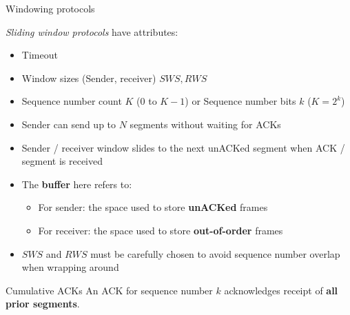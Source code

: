 \begin{definition}
    {Windowing protocols}

    \textit{Sliding window protocols} have attributes:
    \begin{itemize}
        \item Timeout
        \item Window sizes (Sender, receiver) $SWS, RWS$
        \item Sequence number count $K$ (0 to $K-1$) or Sequence number bits $k$ ($K = 2^k$)
    \end{itemize}

    \begin{itemize}
        \item Sender can send up to $N$ segments without waiting for ACKs
        \item Sender / receiver window slides to the next unACKed segment when ACK / segment is received
        \item The \textbf{buffer} here refers to:
              \begin{itemize}
                  \item For sender: the space used to store \textbf{unACKed} frames
                  \item For receiver: the space used to store \textbf{out-of-order} frames
              \end{itemize}
        \item $SWS$ and $RWS$ must be carefully chosen to avoid sequence number overlap when wrapping around
    \end{itemize}
\end{definition}

\begin{knBox}
    {Cumulative ACKs}
    An ACK for sequence number $k$ acknowledges receipt of \textbf{all prior segments}.
\end{knBox}


